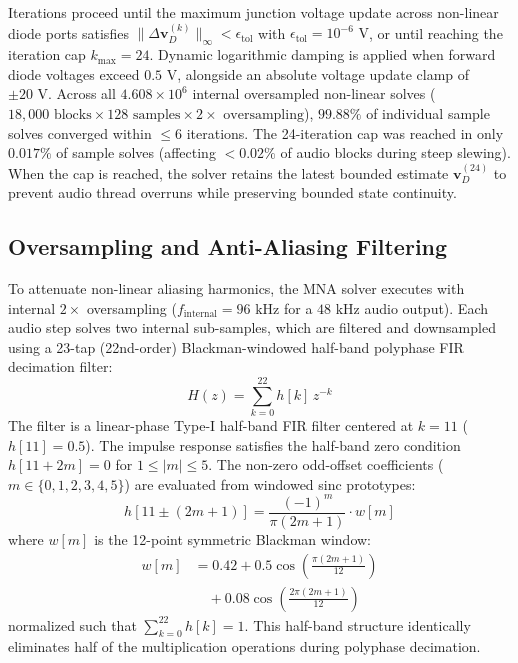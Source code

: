 \documentclass[fleqn,final]{jaes}
\begin{document}
Iterations proceed until the maximum junction voltage update across non-linear diode ports satisfies $\|\Delta \mathbf{v}_D^{(k)}\|_\infty < \epsilon_{\text{tol}}$ with $\epsilon_{\text{tol}} = 10^{-6}\text{ V}$, or until reaching the iteration cap $k_{\max} = 24$. Dynamic logarithmic damping is applied when forward diode voltages exceed $0.5\text{ V}$, alongside an absolute voltage update clamp of $\pm 20\text{ V}$. Across all $4.608 \times 10^6$ internal oversampled non-linear solves ($18,000\text{ blocks} \times 128\text{ samples} \times 2\times\text{ oversampling}$), $99.88\%$ of individual sample solves converged within $\le 6$ iterations. The 24-iteration cap was reached in only $0.017\%$ of sample solves (affecting $< 0.02\%$ of audio blocks during steep slewing). When the cap is reached, the solver retains the latest bounded estimate $\mathbf{v}_D^{(24)}$ to prevent audio thread overruns while preserving bounded state continuity.

\subsection{Oversampling and Anti-Aliasing Filtering}
To attenuate non-linear aliasing harmonics, the MNA solver executes with internal $2\times$ oversampling ($f_{\text{internal}} = 96\text{ kHz}$ for a $48\text{ kHz}$ audio output). Each audio step solves two internal sub-samples, which are filtered and downsampled using a 23-tap (22nd-order) Blackman-windowed half-band polyphase FIR decimation filter:
\begin{equation}
H(z) = \sum_{k=0}^{22} h[k] \, z^{-k}
\end{equation}
The filter is a linear-phase Type-I half-band FIR filter centered at $k=11$ ($h[11] = 0.5$). The impulse response satisfies the half-band zero condition $h[11 + 2m] = 0$ for $1 \le |m| \le 5$. The non-zero odd-offset coefficients ($m \in \{0, 1, 2, 3, 4, 5\}$) are evaluated from windowed sinc prototypes:
\begin{equation}
h[11 \pm (2m+1)] = \frac{(-1)^m}{\pi (2m+1)} \cdot w[m]
\end{equation}
where $w[m]$ is the 12-point symmetric Blackman window:
\begin{equation}
\begin{aligned}
w[m] &= 0.42 + 0.5 \cos\left(\frac{\pi(2m+1)}{12}\right) \\
&\quad + 0.08 \cos\left(\frac{2\pi(2m+1)}{12}\right)
\end{aligned}
\end{equation}
normalized such that $\sum_{k=0}^{22} h[k] = 1$. This half-band structure identically eliminates half of the multiplication operations during polyphase decimation.
\end{document}
